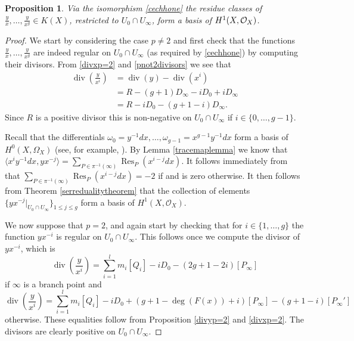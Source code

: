 \documentclass[draft, 11pt]{article} %
\theoremstyle{plain}
\newtheorem{prop}[defn]{Proposition}
\theoremstyle{remark}
\newcommand{\cO}{{\cal O}}
\newcommand{\hzero}{{H^0(X,\Omega_X)}}
\newcommand{\hone}{H^1(X,\mathcal{O}_X)}
\DeclareMathOperator{\res}{Res}
\DeclareMathOperator{\di}{div}
\begin{document}
\begin{prop}\label{basish1}
 Via the isomorphism \eqref{cechhone} the residue classes of $\frac{y}{x}, \ldots , \frac{y}{x^g} \in K(X)$, restricted to $U_0 \cap U_\infty$, form a basis of $H^1(X,\cO_X)$.
\end{prop}
\begin{proof}
We start by considering the case $p \neq 2$ and first check that the functions $\frac{y}{x}, \ldots, \frac{y}{x^g}$ are indeed regular on $U_0 \cap U_\infty$ (as required by \eqref{cechhone}) by computing their divisors.
From \eqref{divxp=2} and \eqref{pnot2divisors} we see that
\begin{align}\label{divisorofyoverx}
\di \left( \frac{y}{x^i} \right) & = \di (y) - \di ( x^i) \nonumber \\
& = R - (g+1)D_\infty - iD_0 + iD_\infty \nonumber \\
& = R - iD_0 - (g+1 - i)D_\infty.
\end{align}
Since $R$ is a positive divisor this is non-negative on $U_0 \cap U_\infty$ if $i\in \{0, \ldots, g-1\}$.


Recall that the differentials $\omega_0 = y^{-1}dx, \ldots, \omega_{g-1} = x^{g-1}y^{-1}dx$ form a basis of $\hzero$ (see, for example, \cite[Chap 7, Prop. 4.26]{liu}).
By Lemma \ref{tracemaplemma} we know that $\langle x^iy^{-1}dx, yx^{-j} \rangle = \sum_{P \in \pi^{-1}(\infty)}\res_P(x^{i-j}dx)$.
It follows immediately from \cite[Chap. III, Thm. 7.14.1(b)]{hart} that $\sum_{P \in \pi^{-1}(\infty)}\res_P(x^{i-j}dx) = -2$ if and is zero otherwise.
It then follows from Theorem \ref{serredualitytheorem} that the collection of elements $\{ yx^{-j}|_{U_0\cap U_\infty}\}_{ 1 \leq j \leq g}$ form a basis of $\hone$.



We now suppose that $p=2$, and again start by checking that for $i \in \{1, \ldots , g\}$ the function $yx^{-i}$ is regular on $U_0 \cap U_\infty$.
This follows once we compute the divisor of $yx^{-i}$, which is
\begin{equation*}
\di \left( \frac{y}{x^i} \right)  =  
{\displaystyle \sum_{i=1}^l} m_i[Q_i] -iD_0 -(2g+1 - 2i)[P_\infty]
\end{equation*}
if $\infty$ is a branch point and
\begin{equation*}
\di \left( \frac{y}{x^i} \right)  =  
{\displaystyle \sum_{i=1}^l} m_i[Q_i] - iD_0 +(g+1-\deg(F(x)) + i)[P_\infty] - (g+1-i)[P_\infty']
\end{equation*}
otherwise.
These equalities follow from Proposition \ref{divyp=2} and \eqref{divxp=2}.
The divisors are clearly positive on $U_0 \cap U_\infty$.


\end{proof}
\end{document}
